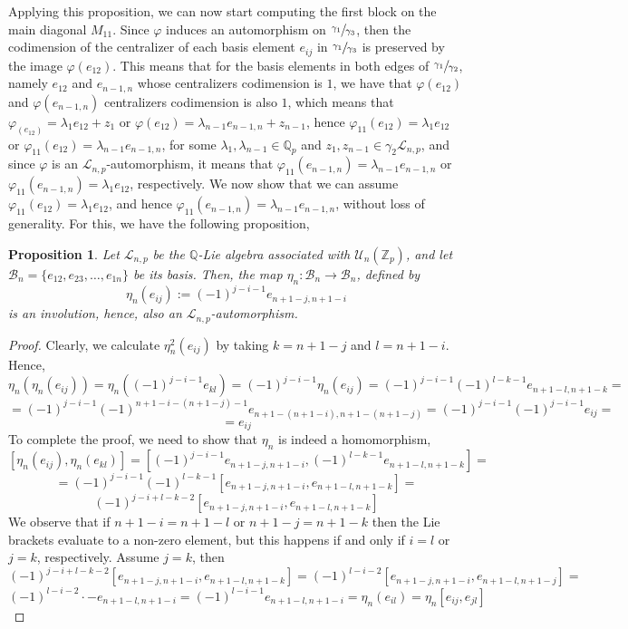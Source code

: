 \documentclass[12pt]{article}
\newtheorem{proposition}[theorem]{Proposition}
\begin{document}
Applying this proposition, we can now start computing the first block on the main diagonal $M_{11}$. Since $\varphi$ induces an automorphism on $\sfrac{\gamma_1}{\gamma_3}$, then the codimension of the centralizer of each basis element $e_{ij}$ in $\sfrac{\gamma_1}{\gamma_3}$ is preserved by the image $\varphi(e_{12})$. This means that for the basis elements in both edges of $\sfrac{\gamma_1}{\gamma_2}$, namely $e_{12}$ and $e_{n-1,n}$ whose centralizers codimension is $1$, we have that $\varphi(e_{12})$ and $\varphi(e_{n-1,n})$ centralizers codimension is also $1$, which means that $\varphi_(e_{12})=\lambda_1 e_{12}+z_1$ or $\varphi(e_{12})=\lambda_{n-1}e_{n-1,n}+z_{n-1}$, hence $\varphi_{11}(e_{12})=\lambda_1 e_{12}$ or $\varphi_{11}(e_{12})=\lambda_{n-1}e_{n-1,n}$, for some $\lambda_1,\lambda_{n-1}\in\mathbb{Q}_p$ and $z_1,z_{n-1}\in\gamma_2\mathcal{L}_{n,p}$, and since $\varphi$ is an $\mathcal{L}_{n,p}$-automorphism, it means that $\varphi_{11}(e_{n-1,n})=\lambda_{n-1}e_{n-1,n}$ or $\varphi_{11}(e_{n-1,n})=\lambda_1 e_{12}$, respectively. We now show that we can assume $\varphi_{11}(e_{12})=\lambda_1 e_{12}$, and hence $\varphi_{11}(e_{n-1,n})=\lambda_{n-1}e_{n-1,n}$, without loss of generality. For this, we have the following proposition,
\begin{proposition}
\label{prop.involution}
Let $\mathcal{L}_{n,p}$ be the $\mathbb{Q}$-Lie algebra associated with $\mathcal{U}_n(\mathbb{Z}_p)$, and let $\mathcal{B}_n=\{e_{12},e_{23},\dots,e_{1n}\}$ be its basis. Then, the map $\eta_n:\mathcal{B}_n\rightarrow \mathcal{B}_n$, defined by \[\eta_n(e_{ij}):=(-1)^{j-i-1}e_{n+1-j,n+1-i}\] is an involution, hence, also an $\mathcal{L}_{n,p}$-automorphism.
\end{proposition}
\begin{proof}
Clearly, we calculate $\eta_n^2(e_{ij})$ by taking $k=n+1-j$ and $l=n+1-i$. Hence, \[\eta_n(\eta_n(e_{ij}))=\eta_n((-1)^{j-i-1}e_{kl})=(-1)^{j-i-1}\eta_n(e_{ij})=(-1)^{j-i-1}(-1)^{l-k-1}e_{n+1-l,n+1-k}=\]\[=(-1)^{j-i-1}(-1)^{n+1-i-(n+1-j)-1}e_{n+1-(n+1-i),n+1-(n+1-j)}=(-1)^{j-i-1}(-1)^{j-i-1}e_{ij}=\]\[=e_{ij}\]
To complete the proof, we need to show that $\eta_n$ is indeed a homomorphism,
\[[\eta_n(e_{ij}),\eta_n(e_{kl})]=[(-1)^{j-i-1}e_{n+1-j,n+1-i},(-1)^{l-k-1}e_{n+1-l,n+1-k}]=\]\[=(-1)^{j-i-1}(-1)^{l-k-1}[e_{n+1-j,n+1-i},e_{n+1-l,n+1-k}]=\]\[(-1)^{j-i+l-k-2}[e_{n+1-j,n+1-i},e_{n+1-l,n+1-k}]\]
We observe that if $n+1-i=n+1-l$ or $n+1-j=n+1-k$ then the Lie brackets evaluate to a non-zero element, but this happens if and only if $i=l$ or $j=k$, respectively. Assume $j=k$, then \[(-1)^{j-i+l-k-2}[e_{n+1-j,n+1-i},e_{n+1-l,n+1-k}]=(-1)^{l-i-2}[e_{n+1-j,n+1-i},e_{n+1-l,n+1-j}]=\]\[(-1)^{l-i-2}\cdot-e_{n+1-l,n+1-i}=(-1)^{l-i-1}e_{n+1-l,n+1-i}=\eta_n(e_{il})=\eta_n[e_{ij},e_{jl}]\] 
\end{proof}
\end{document}
